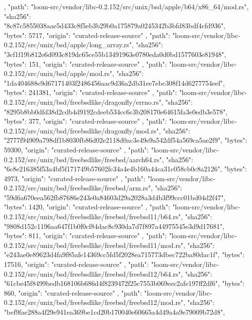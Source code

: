 {{    },
    {
      "path": "loom-src/vendor/libc-0.2.152/src/unix/bsd/apple/b64/x86_64/mod.rs",
      "sha256": "8c87c5855038aae5d433c8f5eb3b29b0a175879a0245342b3bfd83bdf4cfd936",
      "bytes": 5717,
      "origin": "curated-release-source"
    },
    {
      "path": "loom-src/vendor/libc-0.2.152/src/unix/bsd/apple/long_array.rs",
      "sha256": "3cf1f19b812e6d093c819dc65ce55b13491963e0780eda0d0bd1577603e81948",
      "bytes": 151,
      "origin": "curated-release-source"
    },
    {
      "path": "loom-src/vendor/libc-0.2.152/src/unix/bsd/apple/mod.rs",
      "sha256": "1da404688e9d67171403f2486456aac9d36a2db31ee7ebc308f14d6277754eef",
      "bytes": 241381,
      "origin": "curated-release-source"
    },
    {
      "path": "loom-src/vendor/libc-0.2.152/src/unix/bsd/freebsdlike/dragonfly/errno.rs",
      "sha256": "8295b8bb0dfd38d2cdb4d9192cdeeb534cc6c3b208170e64615fa3e0edb3e578",
      "bytes": 377,
      "origin": "curated-release-source"
    },
    {
      "path": "loom-src/vendor/libc-0.2.152/src/unix/bsd/freebsdlike/dragonfly/mod.rs",
      "sha256": "2777f94909a798df1b8030fb86d02e2118d0ac3e49e9a542df54a569ca5ae2f9",
      "bytes": 59300,
      "origin": "curated-release-source"
    },
    {
      "path": "loom-src/vendor/libc-0.2.152/src/unix/bsd/freebsdlike/freebsd/aarch64.rs",
      "sha256": "6c8e216385f53a4bf5f171749b57602fc34a4e4b160a44ca31c058cb0c8a2126",
      "bytes": 4973,
      "origin": "curated-release-source"
    },
    {
      "path": "loom-src/vendor/libc-0.2.152/src/unix/bsd/freebsdlike/freebsd/arm.rs",
      "sha256": "59d6a670eea562fb87686e243e0a84603d29a2028a3d4b3f99ccc01bd04d2f47",
      "bytes": 1420,
      "origin": "curated-release-source"
    },
    {
      "path": "loom-src/vendor/libc-0.2.152/src/unix/bsd/freebsdlike/freebsd/freebsd11/b64.rs",
      "sha256": "9808d152c1196aa647f1b0f0cf84dac8c930da7d7f897a44975545e3d9d17681",
      "bytes": 811,
      "origin": "curated-release-source"
    },
    {
      "path": "loom-src/vendor/libc-0.2.152/src/unix/bsd/freebsdlike/freebsd/freebsd11/mod.rs",
      "sha256": "e243ae0e89623d4fa9f85afe14369cc5fd5f2028ea715773dbec722ba80dac1f",
      "bytes": 17516,
      "origin": "curated-release-source"
    },
    {
      "path": "loom-src/vendor/libc-0.2.152/src/unix/bsd/freebsdlike/freebsd/freebsd12/b64.rs",
      "sha256": "61cbe45f8499bedb168106b686d4f8239472f25c7553b069eec2afe197ff2df6",
      "bytes": 860,
      "origin": "curated-release-source"
    },
    {
      "path": "loom-src/vendor/libc-0.2.152/src/unix/bsd/freebsdlike/freebsd/freebsd12/mod.rs",
      "sha256": "bef9fae288a4f29e941ea369be1cd20b170040e60665a4d49a4a9e79009b72d8",
}}
